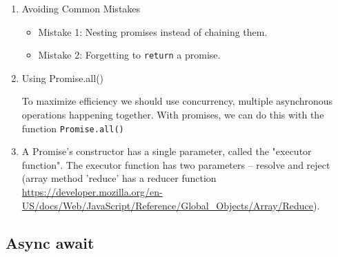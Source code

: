 \documentclass[a4paper, 12pt]{article}
\begin{document}
\begin{enumerate}
\item Avoiding Common Mistakes
\begin{itemize}
\item Mistake 1: Nesting promises instead of chaining them.
\item Mistake 2: Forgetting to \verb|return| a promise.
\end{itemize}

\item Using Promise.all()

To maximize efficiency we should use concurrency, multiple asynchronous operations happening together. With promises, we can do this with the function \verb|Promise.all()|

\item A Promise's constructor has a single parameter, called the "executor function". The executor function has two parameters -- resolve and reject (array method 'reduce' has a reducer function \url{https://developer.mozilla.org/en-US/docs/Web/JavaScript/Reference/Global_Objects/Array/Reduce}).

\end{enumerate}

\subsection{Async await}
\end{document}
